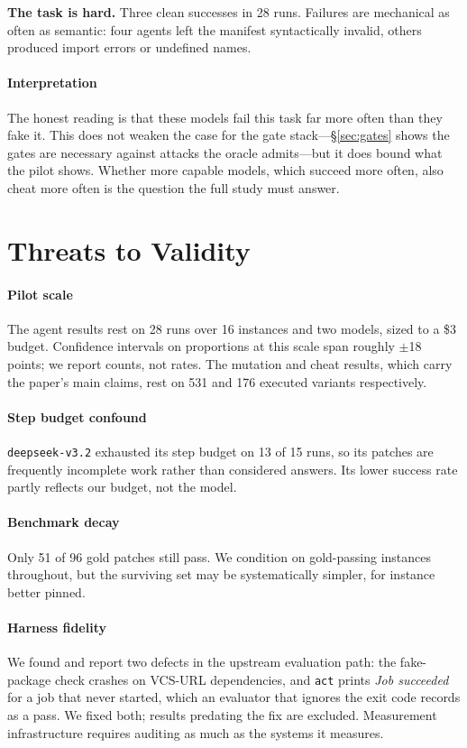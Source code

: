 \documentclass[10pt,conference]{IEEEtran}
\newcommand{\code}[1]{\texttt{\small #1}}
\begin{document}
\textbf{The task is hard.} Three clean successes in 28 runs. Failures are
mechanical as often as semantic: four agents left the manifest
syntactically invalid, others produced import errors or undefined names.

\paragraph*{Interpretation} The honest reading is that these models fail
this task far more often than they fake it. This does not weaken the case
for the gate stack---\S\ref{sec:gates} shows the gates are necessary
against attacks the oracle admits---but it does bound what the pilot
shows. Whether more capable models, which succeed more often, also cheat
more often is the question the full study must answer.

\section{Threats to Validity}
\label{sec:threats}

\paragraph*{Pilot scale} The agent results rest on 28 runs over 16
instances and two models, sized to a \$3 budget. Confidence intervals on
proportions at this scale span roughly $\pm$18 points; we report counts,
not rates. The mutation and cheat results, which carry the paper's main
claims, rest on 531 and 176 executed variants respectively.

\paragraph*{Step budget confound} \code{deepseek-v3.2} exhausted its step
budget on 13 of 15 runs, so its patches are frequently incomplete work
rather than considered answers. Its lower success rate partly reflects
our budget, not the model.

\paragraph*{Benchmark decay} Only 51 of 96 gold patches still pass. We
condition on gold-passing instances throughout, but the surviving set may
be systematically simpler, for instance better pinned.

\paragraph*{Harness fidelity} We found and report two defects in the
upstream evaluation path: the fake-package check crashes on VCS-URL
dependencies, and \code{act} prints \emph{Job succeeded} for a job that
never started, which an evaluator that ignores the exit code records as a
pass. We fixed both; results predating the fix are excluded. Measurement
infrastructure requires auditing as much as the systems it measures.
\end{document}
